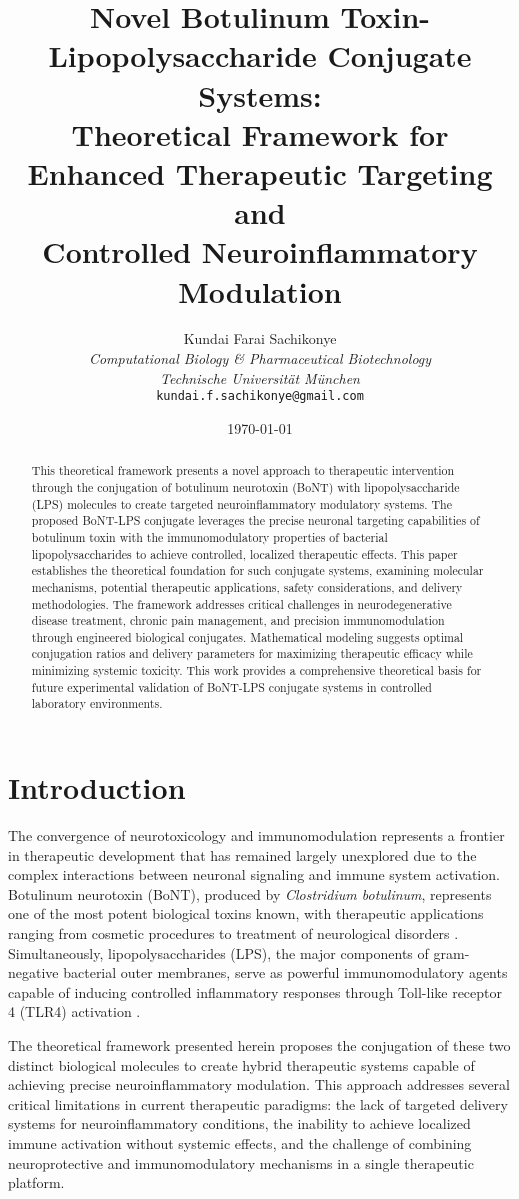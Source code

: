 \documentclass[11pt,a4paper]{article}
\title{\textbf{Novel Botulinum Toxin-Lipopolysaccharide Conjugate Systems: \\
Theoretical Framework for Enhanced Therapeutic Targeting and \\
Controlled Neuroinflammatory Modulation}}
\author{
Kundai Farai Sachikonye\\
\textit{Computational Biology \& Pharmaceutical Biotechnology}\\
\textit{Technische Universität München}\\
\texttt{kundai.f.sachikonye@gmail.com}
}
\date{\today}
\begin{document}
\maketitle

\begin{abstract}
This theoretical framework presents a novel approach to therapeutic intervention through the conjugation of botulinum neurotoxin (BoNT) with lipopolysaccharide (LPS) molecules to create targeted neuroinflammatory modulatory systems. The proposed BoNT-LPS conjugate leverages the precise neuronal targeting capabilities of botulinum toxin with the immunomodulatory properties of bacterial lipopolysaccharides to achieve controlled, localized therapeutic effects. This paper establishes the theoretical foundation for such conjugate systems, examining molecular mechanisms, potential therapeutic applications, safety considerations, and delivery methodologies. The framework addresses critical challenges in neurodegenerative disease treatment, chronic pain management, and precision immunomodulation through engineered biological conjugates. Mathematical modeling suggests optimal conjugation ratios and delivery parameters for maximizing therapeutic efficacy while minimizing systemic toxicity. This work provides a comprehensive theoretical basis for future experimental validation of BoNT-LPS conjugate systems in controlled laboratory environments.
\end{abstract}

\section{Introduction}

The convergence of neurotoxicology and immunomodulation represents a frontier in therapeutic development that has remained largely unexplored due to the complex interactions between neuronal signaling and immune system activation. Botulinum neurotoxin (BoNT), produced by \textit{Clostridium botulinum}, represents one of the most potent biological toxins known, with therapeutic applications ranging from cosmetic procedures to treatment of neurological disorders \cite{Pirazzini2017}. Simultaneously, lipopolysaccharides (LPS), the major components of gram-negative bacterial outer membranes, serve as powerful immunomodulatory agents capable of inducing controlled inflammatory responses through Toll-like receptor 4 (TLR4) activation \cite{Raetz2002}.

The theoretical framework presented herein proposes the conjugation of these two distinct biological molecules to create hybrid therapeutic systems capable of achieving precise neuroinflammatory modulation. This approach addresses several critical limitations in current therapeutic paradigms: the lack of targeted delivery systems for neuroinflammatory conditions, the inability to achieve localized immune activation without systemic effects, and the challenge of combining neuroprotective and immunomodulatory mechanisms in a single therapeutic platform.
\end{document}
